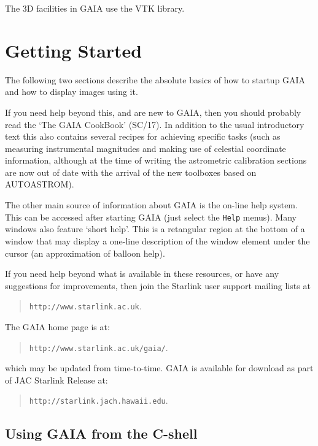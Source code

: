\documentclass[twoside,11pt]{article}
\newcommand{\htmladdnormallink}[2]{#1}
\newcommand{\xref}[3]{#1}
\newcommand{\xlabel}[1]{}
\renewcommand{\_}{\texttt{\symbol{95}}}
\newcommand{\mytt}[1]{{\texttt{#1}}}
\begin{document}
The 3D facilities in GAIA use the
\htmladdnormallink{VTK}{http://www.kitware.com} library.

\section{\xlabel{getting_started}Getting Started}

The following two sections describe the absolute basics of how to
startup GAIA and how to display images using it.

If you need help beyond this, and are new to GAIA, then you should probably
read the `The GAIA CookBook' (\xref{SC/17}{sc17}{}). In addition to the usual
introductory text this also contains several recipes for achieving specific
tasks (such as measuring instrumental magnitudes and making use of celestial
coordinate information, although at the time of writing the astrometric
calibration sections are now out of date with the arrival of the new toolboxes
based on AUTOASTROM).

The other main source of information about GAIA is the
\xref{on-line help system}{gaia}{regions}.
This can be accessed after starting GAIA (just select the
\mytt{Help} menus). Many windows also feature `short help'. This is a
retangular region at the bottom of a window that may display a
one-line description of the window element under the cursor (an
approximation of balloon help).

If you need help beyond what is available in these resources, or have
any suggestions for improvements, then join the Starlink user support
mailing lists at
\begin{quote}
\htmladdnormallink{\mytt{http://www.starlink.ac.uk}}{http://www.starlink.ac.uk}.
\end{quote}
The GAIA home page is at:
\begin{quote}
\htmladdnormallink{\mytt{http://www.starlink.ac.uk/gaia/}}{http://www.starlink.ac.uk/gaia/}.
\end{quote}
which may be updated from time-to-time. GAIA is available for download
as part of JAC Starlink Release at:
\begin{quote}
\htmladdnormallink{\mytt{http://starlink.jach.hawaii.edu}}{http://starlink.jach.hawaii.edu}.
\end{quote}

\subsection{\xlabel{using_gaia_from_the_cshell}Using GAIA from the C-shell}
\end{document}
